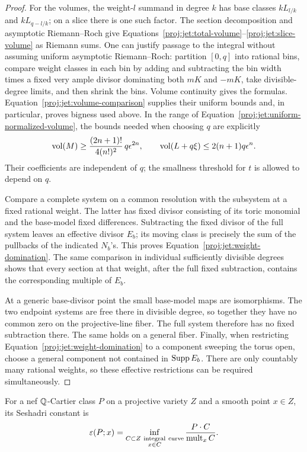 \begin{proof}
For the volumes, the weight-\(l\) summand in degree \(k\) has base
classes \(kL_{l/k}\) and \(kL_{q-l/k}\); on a slice there is one
such factor.  The section decomposition and asymptotic Riemann--Roch
give Equations~\eqref{proj:jet:total-volume}--\eqref{proj:jet:slice-volume}
as Riemann sums.  One can justify passage to the integral without
assuming uniform asymptotic Riemann--Roch: partition \([0,q]\) into
rational bins, compare weight classes in each bin by adding and
subtracting the bin width times a fixed very ample divisor
dominating both \(mK\) and \(-mK\), take divisible-degree limits,
and then shrink the bins.  Volume continuity gives the formulas.
Equation~\eqref{proj:jet:volume-comparison} supplies their uniform bounds
and, in particular, proves bigness used above.
In the range of Equation~\eqref{proj:jet:uniform-normalized-volume},
the bounds needed when choosing \(q\) are explicitly
\[
 \operatorname{vol}(M)\ge \frac{(2n+1)!}{4(n!)^2}\,q\epsilon^{2n},
 \qquad
 \operatorname{vol}(L+q\xi)\le2(n+1)q\epsilon^n.
\]
Their coefficients are independent of \(q\); the smallness threshold
for \(t\) is allowed to depend on \(q\).

Compare a complete system on a common resolution with the subsystem
at a fixed rational weight.  The latter has fixed divisor consisting
of its toric monomial and the base-model fixed differences.
Subtracting the fixed divisor of the full system leaves an effective
divisor \(E_b\); its moving class is precisely the sum of the
pullbacks of the indicated \(N_b\)'s.  This proves
Equation~\eqref{proj:jet:weight-domination}.  The same comparison in
individual sufficiently divisible degrees shows that every section
at that weight, after the full fixed subtraction, contains the
corresponding multiple of \(E_b\).

At a generic base-divisor point the small base-model maps are
isomorphisms.  The two endpoint systems are free there in divisible
degree, so together they have no common zero on the projective-line
fiber.  The full system therefore has no fixed subtraction there.
The same holds on a general fiber.  Finally, when restricting
Equation~\eqref{proj:jet:weight-domination} to a component sweeping the
torus open, choose a general component not contained in
\(\operatorname{Supp} E_b\).  There are only countably many rational weights, so
these effective restrictions can be required simultaneously.
\end{proof}

For a nef \(\mathbb{Q}\)-Cartier class \(P\) on a projective variety \(Z\)
and a smooth point \(x\in Z\), its Seshadri constant is
\[
 \varepsilon(P;x)=
 \inf_{\substack{C\subset Z\ \mathrm{integral\ curve}\\x\in C}}
       \frac{P\cdot C}{\operatorname{mult}_x C}.
\]

